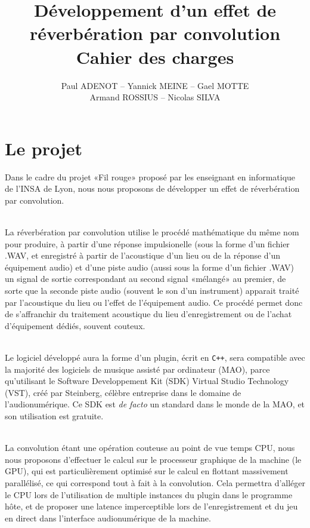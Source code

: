 \author{Paul ADENOT -- Yannick MEINE -- Gael MOTTE \\ Armand ROSSIUS -- Nicolas SILVA }
\title{D\'{e}veloppement d'un effet de r\'{e}verb\'{e}ration par convolution\\Cahier des charges}


\maketitle
\tableofcontents
\section{Le projet}
Dans le cadre du projet «Fil rouge» proposé par les enseignant en informatique de l'INSA de Lyon, nous nous proposons de développer un effet de réverbération par convolution.

~\\
La réverbération par convolution utilise le procédé mathématique du même nom pour produire, à partir d'une réponse impulsionelle (sous la forme d'un fichier .WAV, et enregistré à partir de l'acoustique d'un lieu ou de la réponse d'un équipement audio) et d'une piste audio (aussi sous la forme d'un fichier .WAV) un signal de sortie correspondant au second signal «mélangé» au premier, de sorte que la seconde piste audio (souvent le son d'un instrument) apparait traité par l'acoustique du lieu ou l'effet de l'équipement audio. Ce procédé permet donc de s'affranchir du traitement acoustique du lieu d'enregistrement ou de l'achat d'équipement dédiés, souvent couteux.

~\\
Le logiciel développé aura la forme d'un plugin, écrit en {\tt C++}, sera compatible avec la majorité des logiciels de musique assisté par ordinateur (MAO), parce qu'utilisant le Software Developpement Kit (SDK) Virtual Studio Technology (VST), créé par Steinberg, célèbre entreprise dans le domaine de l'audionumérique. Ce SDK est \emph{de facto} un standard dans le monde de la MAO, et son utilisation est gratuite. 

~\\
La convolution étant une opération couteuse au point de vue temps CPU, nous nous proposons d'effectuer le calcul sur le processeur graphique de la machine (le GPU), qui est particulièrement optimisé sur le calcul en flottant massivement parallélisé, ce qui correspond tout à fait à la convolution. Cela permettra d'alléger le CPU lors de l'utilisation de multiple instances du plugin dans le programme hôte, et de proposer une latence imperceptible lors de l'enregistrement et du jeu en direct dans l'interface audionumérique de la machine.

